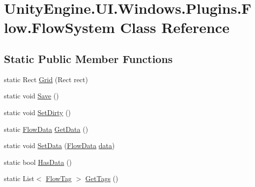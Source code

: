 \hypertarget{class_unity_engine_1_1_u_i_1_1_windows_1_1_plugins_1_1_flow_1_1_flow_system}{}\section{Unity\+Engine.\+U\+I.\+Windows.\+Plugins.\+Flow.\+Flow\+System Class Reference}
\label{class_unity_engine_1_1_u_i_1_1_windows_1_1_plugins_1_1_flow_1_1_flow_system}
\subsection*{Static Public Member Functions}
\begin{DoxyCompactItemize}
\item 
static Rect \hyperlink{class_unity_engine_1_1_u_i_1_1_windows_1_1_plugins_1_1_flow_1_1_flow_system_a78f2113bbd5f5ec0a802e9cbaa2bdfb4}{Grid} (Rect rect)
\item 
static void \hyperlink{class_unity_engine_1_1_u_i_1_1_windows_1_1_plugins_1_1_flow_1_1_flow_system_abadfb549ac583d625fa41d91f6661344}{Save} ()
\item 
static void \hyperlink{class_unity_engine_1_1_u_i_1_1_windows_1_1_plugins_1_1_flow_1_1_flow_system_ae3081c11d46abdf1a6ca6626b55aac09}{Set\+Dirty} ()
\item 
static \hyperlink{class_unity_engine_1_1_u_i_1_1_windows_1_1_plugins_1_1_flow_1_1_flow_data}{Flow\+Data} \hyperlink{class_unity_engine_1_1_u_i_1_1_windows_1_1_plugins_1_1_flow_1_1_flow_system_aa3cc28a9e0e7ff16c196b4fffa854877}{Get\+Data} ()
\item 
static void \hyperlink{class_unity_engine_1_1_u_i_1_1_windows_1_1_plugins_1_1_flow_1_1_flow_system_a5ad7abf1e70084cd99e0d98c523d8945}{Set\+Data} (\hyperlink{class_unity_engine_1_1_u_i_1_1_windows_1_1_plugins_1_1_flow_1_1_flow_data}{Flow\+Data} \hyperlink{class_unity_engine_1_1_u_i_1_1_windows_1_1_plugins_1_1_flow_1_1_flow_system_a631b58fb3f6a04bf6501aee2a8131821}{data})
\item 
static bool \hyperlink{class_unity_engine_1_1_u_i_1_1_windows_1_1_plugins_1_1_flow_1_1_flow_system_a6e0b50a1956818818c1dc85196f145c4}{Has\+Data} ()
\item 
static List$<$ \hyperlink{class_unity_engine_1_1_u_i_1_1_windows_1_1_plugins_1_1_flow_1_1_flow_tag}{Flow\+Tag} $>$ \hyperlink{class_unity_engine_1_1_u_i_1_1_windows_1_1_plugins_1_1_flow_1_1_flow_system_a40ab09f93abd3eec523208b6d256a27c}{Get\+Tags} ()

\end{DoxyCompactItemize}
